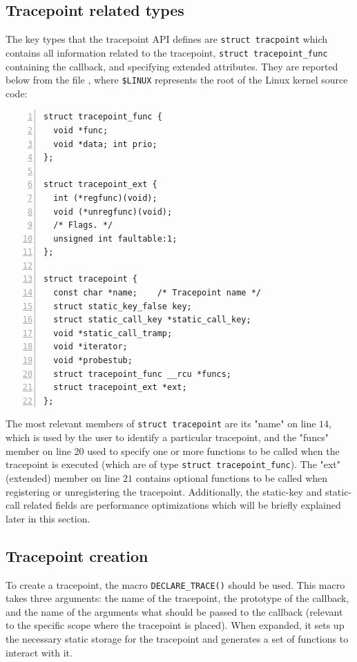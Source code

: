 \subsection{Tracepoint related types}

The key types that the tracepoint API defines are \verb|struct tracpoint| which
contains all information related to the tracepoint, \verb|struct tracepoint_func|
containing the callback, and 
specifying extended attributes. They are reported below from the file
, where \verb|$LINUX|
represents the root of the Linux kernel source code:

\begin{Verbatim}[numbers=left, numbersep=5pt, frame=single]
struct tracepoint_func {
  void *func;
  void *data; int prio;
};

struct tracepoint_ext {
  int (*regfunc)(void);
  void (*unregfunc)(void);
  /* Flags. */
  unsigned int faultable:1;
};

struct tracepoint {
  const char *name;    /* Tracepoint name */
  struct static_key_false key;
  struct static_call_key *static_call_key;
  void *static_call_tramp;
  void *iterator;
  void *probestub;
  struct tracepoint_func __rcu *funcs;
  struct tracepoint_ext *ext;
};
\end{Verbatim}

The most relevant members of \verb|struct tracepoint| are its "name" on line
$14$, which is used by the user to identify a particular tracepoint, and the
"funcs" member on line $20$ used to specify one or more functions to be called
when the tracepoint is executed (which are of type \verb|struct tracepoint_func|).
The "ext" (extended) member on line $21$ contains optional
functions to be called when registering or unregistering the tracepoint.
Additionally, the static-key and static-call related fields are performance
optimizations which will be briefly explained later in this section.

\subsection{Tracepoint creation}

To create a tracepoint, the macro \verb|DECLARE_TRACE()| should be used. This
macro takes three arguments: the name of the tracepoint, the prototype of the
callback, and the name of the arguments what should be passed to the callback
(relevant to the specific scope where the tracepoint is placed). When expanded,
it sets up the necessary static storage for the tracepoint and generates a set
of functions to interact with it.

